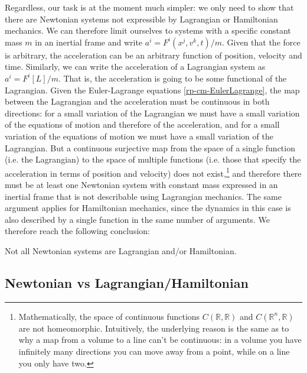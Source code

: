 Regardless, our task is at the moment much simpler: we only need to show that there are Newtonian systems not expressible by Lagrangian or Hamiltonian mechanics. We can therefore limit ourselves to systems with a specific constant mass $m$ in an inertial frame and write $a^i=F^i(x^j, v^k, t)/m$. Given that the force is arbitrary, the acceleration can be an arbitrary function of position, velocity and time. Similarly, we can write the acceleration of a Lagrangian system as $a^i=F^i[L]/m$. That is, the acceleration is going to be some functional of the Lagrangian. Given the Euler-Lagrange equations \ref{rp-cm-EulerLagrange}, the map between the Lagrangian and the acceleration must be continuous in both directions: for a small variation of the Lagrangian we must have a small variation of the equations of motion and therefore of the acceleration, and for a small variation of the equations of motion we must have a small variation of the Lagrangian. But a continuous surjective map from the space of a single function (i.e. the Lagrangian) to the space of multiple functions (i.e. those that specify the acceleration in terms of position and velocity) does not exist,\footnote{Mathematically, the space of continuous functions $C(\mathbb{R}, \mathbb{R})$ and $C(\mathbb{R}^n, \mathbb{R})$ are not homeomorphic. Intuitively, the underlying reason is the same as to why a map from a volume to a line can't be continuous: in a volume you have infinitely many directions you can move away from a point, while on a line you only have two.} and therefore there must be at least one Newtonian system with constant mass expressed in an inertial frame that is not describable using Lagrangian mechanics. The same argument applies for Hamiltonian mechanics, since the dynamics in this case is also described by a single function in the same number of arguments. We therefore reach the following conclusion:
\begin{insight}
	Not all Newtonian systems are Lagrangian and/or Hamiltonian.
\end{insight}

\subsection{Newtonian vs Lagrangian/Hamiltonian}

